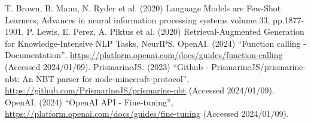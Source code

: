 \begin{thebibliography}{99}
    T. Brown, B. Mann, N. Ryder et al. (2020) 
    Language Models are Few-Shot Learners, 
    Advances in neural information processing systems volume 33, pp.1877-1901.
    P. Lewis, E. Perez, A. Piktus et al. (2020) 
    Retrieval-Augmented Generation for Knowledge-Intensive NLP Tasks, 
    NeurIPS.
    OpenAI. (2024)
    ``Function calling -Documentation'',
    \url{https://platform.openai.com/docs/guides/function-calling} (Accessed 2024/01/09).
    PrismarineJS. (2023) 
    ``Github - PrismarineJS/prismarine-nbt: An NBT parser for node-minecraft-protocol'', 
    \url{https://github.com/PrismarineJS/prismarine-nbt} (Accessed 2024/01/09).
    OpenAI. (2024) 
    ``OpenAI API - Fine-tuning'', 
    \url{https://platform.openai.com/docs/guides/fine-tuning} (Accessed 2024/01/09).







\end{thebibliography}

